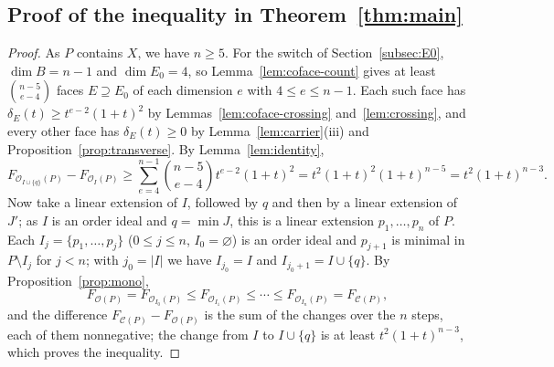 \documentclass[11pt]{article}
\theoremstyle{definition}
\theoremstyle{remark}
\newcommand{\OO}{\mathcal O}
\newcommand{\CC}{\mathcal C}
\begin{document}
\subsection{Proof of the inequality in Theorem~\ref{thm:main}}\label{subsec:sum}
\begin{proof}[Proof]
As $P$ contains $X$, we have $n\geq5$. For the switch of Section~\ref{subsec:E0}, $\dim B=n-1$ and $\dim
E_0=4$, so Lemma~\ref{lem:coface-count} gives at least
$\binom{n-5}{e-4}$ faces $E\supseteq E_0$ of each dimension $e$ with
$4\leq e\leq n-1$. Each such face has $\delta_E(t)\geq t^{e-2}(1+t)^2$ by
Lemmas~\ref{lem:coface-crossing} and~\ref{lem:crossing}, and every other face has $\delta_E(t)\geq0$ by Lemma~\ref{lem:carrier}(iii) and
Proposition~\ref{prop:transverse}. By Lemma~\ref{lem:identity},
\[
F_{\OO_{I\cup\{q\}}(P)}-F_{\OO_I(P)}
\geq\sum_{e=4}^{n-1}\binom{n-5}{e-4}t^{e-2}(1+t)^2
=t^2(1+t)^2(1+t)^{n-5}=t^2(1+t)^{n-3}.
\]
Now take a linear extension of $I$, followed by $q$ and then by a linear extension of $J'$; as $I$ is an order ideal and $q=\min J$,
this is a linear extension $p_1,\ldots,p_n$ of $P$. Each
$I_j=\{p_1,\ldots,p_j\}$ ($0\leq j\leq n$, $I_0=\varnothing$) is an order ideal and $p_{j+1}$ is minimal in $P\setminus I_j$ for $j<n$; with $j_0=|I|$ we have
$I_{j_0}=I$ and $I_{j_0+1}=I\cup\{q\}$. By
Proposition~\ref{prop:mono},
\[
F_{\OO(P)}=F_{\OO_{I_0}(P)}\leq F_{\OO_{I_1}(P)}\leq\cdots\leq
F_{\OO_{I_n}(P)}=F_{\CC(P)},
\]
and the difference $F_{\CC(P)}-F_{\OO(P)}$ is the sum of the changes over the $n$ steps, each of them nonnegative; the change
from $I$ to $I\cup\{q\}$ is at least $t^2(1+t)^{n-3}$, which proves the inequality.
\end{proof}
\end{document}
